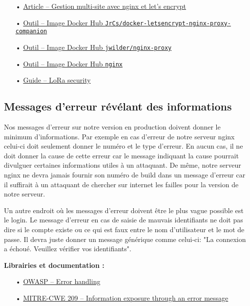 \begin{itemize}
\item[•] \href{https://meta.discourse.org/t/help-multisite-with-letsencrypt-nginx-proxy-companion/88192}{Article -- Gestion multi-site avec nginx et let's encrypt}
\item[•] \href{https://github.com/JrCs/docker-letsencrypt-nginx-proxy-companion}{Outil -- Image Docker Hub \texttt{JrCs/docker-letsencrypt-nginx-proxy-companion}}
\item[•] \href{https://github.com/jwilder/nginx-proxy}{Outil -- Image Docker Hub \texttt{jwilder/nginx-proxy}}
\item[•] \href{https://hub.docker.com/_/nginx/}{Outil -- Image Docker Hub \texttt{nginx}}
\item[•] \href{https://labs.mwrinfosecurity.com/assets/BlogFiles/mwri-LoRa-security-guide-1.2-2016-03-22.pdf}{Guide -- LoRa security}
\end{itemize}

\subsection{Messages d'erreur révélant des informations}
\label{ssec:cm-messageserreurs}

Nos messages d'erreur sur notre version en production doivent donner le minimum d'informations. Par exemple en cas d'erreur de notre serveur nginx celui-ci doit seulement donner le numéro et le type d'erreur. En aucun cas, il ne doit donner la cause de cette erreur car le message indiquant la cause pourrait divulguer certaines informations utiles à un attaquant. De même, notre serveur nginx ne devra jamais fournir son numéro de build dans un message d'erreur car il suffirait à un attaquant de chercher sur internet les failles pour la version de notre serveur.

Un autre endroit où les messages d'erreur doivent être le plus vague possible est le login. Le message d'erreur en cas de saisie de mauvais identifiants ne doit pas dire si le compte existe ou ce qui est faux entre le nom d'utilisateur et le mot de passe. Il devra juste donner un message générique comme celui-ci: "La connexion a échoué. Veuillez vérifier vos identifiants".

\medskip
\textbf{Librairies et documentation :}

\begin{itemize}
\item[•] \href{https://www.owasp.org/index.php/Error_Handling}{OWASP -- Error handling}
\item[•] \href{https://cwe.mitre.org/data/definitions/209.html}{MITRE-CWE 209 -- Information exposure through an error message}
\end{itemize}

